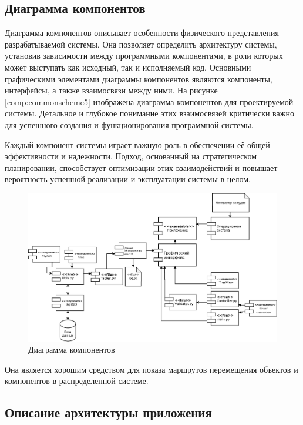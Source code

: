 \subsection{Диаграмма компонентов}
Диаграмма компонентов описывает особенности физического представления разрабатываемой системы. Она позволяет определить архитектуру системы, установив зависимости между программными компонентами, в роли которых может выступать как исходный, так и исполняемый код. Основными графическими элементами диаграммы компонентов являются компоненты, интерфейсы, а также взаимосвязи между ними. На рисунке \ref{comp:commonscheme5} изображена диаграмма компонентов для проектируемой системы. Детальное и глубокое понимание этих взаимосвязей критически важно для успешного создания и функционирования программной системы.

Каждый компонент системы играет важную роль в обеспечении её общей эффективности и надежности.
Подход, основанный на стратегическом планировании, способствует оптимизации этих взаимодействий и повышает вероятность успешной реализации и эксплуатации системы в целом.
\begin{landscape}
\begin{figure} [H]
	\centering
	\includegraphics[width=1\linewidth]{images/CompDiag}
	\caption{Диаграмма компонентов}
	\label{fig:commonscheme5}
\end{figure}
\end{landscape}
Она является хорошим средством для показа маршрутов перемещения объектов и компонентов в распределенной системе.

\subsection{Описание архитектуры приложения}

